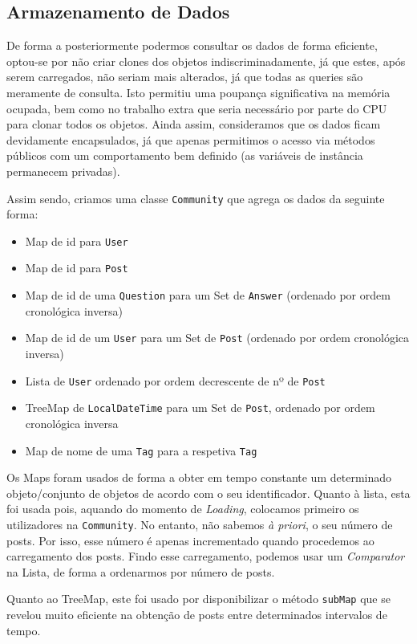 \documentclass[a4paper]{article}
\begin{document}
	\subsection{Armazenamento de Dados}\label{sec:community}
		\tab De forma a posteriormente podermos consultar os dados de forma eficiente,
		optou-se por não criar clones dos objetos indiscriminadamente, já que estes,
		após serem carregados, não seriam mais alterados, já que todas as queries são
		meramente de consulta. Isto permitiu uma poupança significativa na memória ocupada,
		bem como no trabalho extra que seria necessário por parte do CPU para clonar todos
		os objetos. Ainda assim, consideramos que os dados ficam devidamente encapsulados,
		já que apenas permitimos o acesso via métodos públicos com um comportamento bem
		definido (as variáveis de instância permanecem privadas).
		\par Assim sendo, criamos uma classe \texttt{Community} que agrega os dados
		da seguinte forma:
			\begin{itemize}
				\item Map de id para \texttt{User}
				\item Map de id para \texttt{Post}
				\item Map de id de uma \texttt{Question} para um Set de \texttt{Answer} (ordenado por ordem
				cronológica inversa)
				\item Map de id de um \texttt{User} para um Set de \texttt{Post} (ordenado por ordem
				cronológica inversa)
				\item Lista de \texttt{User} ordenado por ordem decrescente de nº de \texttt{Post}
				\item TreeMap de \texttt{LocalDateTime} para um Set de \texttt{Post}, ordenado por ordem
				cronológica inversa
				\item Map de nome de uma \texttt{Tag} para a respetiva \texttt{Tag}
			\end{itemize}
		\par Os Maps foram usados de forma a obter em tempo constante um determinado objeto/conjunto
		de objetos de acordo com o seu identificador. Quanto à lista, esta foi usada pois, aquando
		do momento de \textit{Loading}, colocamos primeiro os utilizadores na \texttt{Community}. No
		entanto, não sabemos \textit{à priori}, o seu número de posts. Por isso, esse número é apenas
		incrementado quando procedemos ao carregamento dos posts. Findo esse carregamento, podemos
		usar um \textit{Comparator} na Lista, de forma a ordenarmos por número de posts.
		\par Quanto ao TreeMap, este foi usado por disponibilizar o método \texttt{subMap} que
		se revelou muito eficiente na obtenção de posts entre determinados intervalos de tempo.
\end{document}
